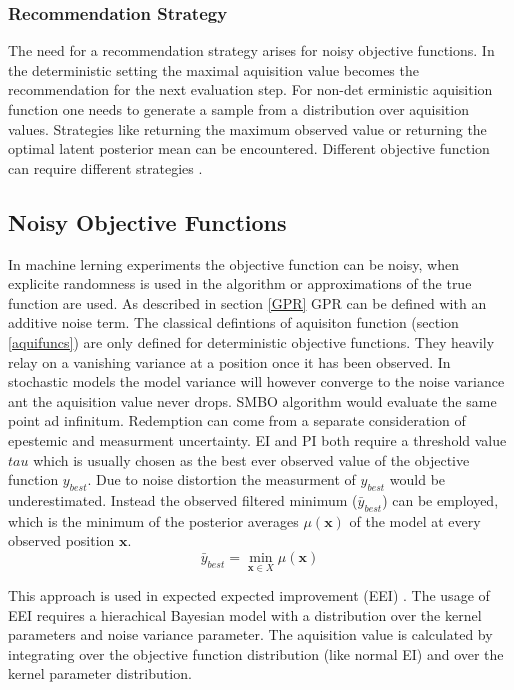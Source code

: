 \documentclass[english]{article}
\newcommand{\x}{\mathbf{x}}
\begin{document}
\subsubsection*{Recommendation Strategy}
The need for a recommendation strategy arises for noisy objective functions. In the deterministic setting the maximal aquisition value becomes the recommendation for the next evaluation step. For non-det erministic aquisition function one needs to generate a sample from a distribution over aquisition values. Strategies like returning the maximum observed value or returning the optimal latent posterior mean can be encountered. Different objective function can require different strategies \cite{hoffman_modular_2014}.

\subsection{Noisy Objective Functions}
In machine lerning experiments the objective function can be noisy, when explicite randomness is used in the algorithm or approximations of the true function are used. As described in section \ref{GPR} GPR can be defined with an additive noise term. The classical defintions of aquisiton function (section \ref{aquifuncs}) are only defined for deterministic objective functions. They heavily relay on a vanishing variance at a position once it has been observed.  In stochastic models the model variance will however converge to the noise variance ant the aquisition value never drops. SMBO algorithm would evaluate the same point ad infinitum. Redemption can come from a separate consideration of epestemic and measurment uncertainty.
EI and PI both require a threshold value $tau$ which is usually chosen as the best ever observed value of the objective function $y_{best}$. Due to noise distortion the measurment of $y_{best}$ would be underestimated.  Instead the observed filtered minimum ($\bar{y}_{best}$) can be employed, which is the minimum of the posterior averages $\mu(\x)$ of the model at every observed position $\x$.
\begin{equation}
  \bar{y}_{best} = \min_{\x \in X} \mu(\x)
\end{equation}

This approach is used in expected expected improvement (EEI) \cite{pandita_extending_2016}. The usage of EEI requires a hierachical Bayesian model with a distribution over the kernel parameters and noise variance parameter. The aquisition value is calculated by integrating over the objective function distribution (like normal EI) and over the kernel parameter distribution.
\end{document}
